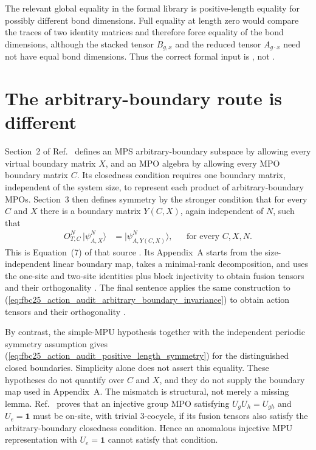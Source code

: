 \documentclass{article}
\begin{document}
The relevant global equality in the formal library is positive-length equality
for possibly different bond dimensions.  Full equality at length zero would
compare the traces of two identity matrices and therefore force equality of
the bond dimensions, although the stacked tensor $B_{g,x}$ and the reduced
tensor $A_{g\mathbin{\cdot}x}$ need not have equal bond dimensions.  Thus the
correct formal input is
, not
.

\section{The arbitrary-boundary route is different}

Section~2 of Ref.~\cite[source lines~302--331]{GarreRubio2023MPOSym} defines
an MPS arbitrary-boundary subspace by allowing every virtual boundary matrix
$X$, and an MPO algebra by allowing every MPO boundary matrix $C$.  Its
closedness condition requires one boundary matrix, independent of the system
size, to represent each product of arbitrary-boundary MPOs.  Section~3 then
defines symmetry by the stronger condition that for every $C$ and $X$ there
is a boundary matrix $Y(C,X)$, again independent of $N$, such that
\begin{align}
    O^N_{T,C}\,\lvert\psi^N_{A,X}\rangle
        &=\lvert\psi^N_{A,Y(C,X)}\rangle,
        &&\text{for every }C,X,N.
    \label{eq:fbc25_action_audit_arbitrary_boundary_invariance}
\end{align}
This is Equation~(7) of that source
\cite[source lines~429--460]{GarreRubio2023MPOSym}.  Its Appendix~A starts
from the size-independent linear boundary map, takes a minimal-rank
decomposition, and uses the one-site and two-site identities plus block
injectivity to obtain fusion tensors and their orthogonality
\cite[source lines~2305--2454]{GarreRubio2023MPOSym}.  The final sentence
applies the same construction to
(\ref{eq:fbc25_action_audit_arbitrary_boundary_invariance}) to obtain action
tensors and their orthogonality
\cite[source line~2455]{GarreRubio2023MPOSym}.

By contrast, the simple-MPU hypothesis together with the independent periodic
symmetry assumption gives
(\ref{eq:fbc25_action_audit_positive_length_symmetry}) for the distinguished
closed boundaries.  Simplicity alone does not assert this equality.  These
hypotheses do not quantify over $C$ and $X$, and they do not supply the
boundary map used in Appendix~A.  The mismatch is structural, not merely a
missing lemma.  Ref.~\cite[source lines~1211--1216]{GarreRubio2023MPOSym}
proves that an injective group MPO satisfying $U_gU_h=U_{gh}$ and
$U_e=\mathbf 1$ must be on-site, with trivial $3$-cocycle, if its fusion
tensors also satisfy the arbitrary-boundary closedness condition.  Hence an
anomalous injective MPU representation with $U_e=\mathbf 1$ cannot satisfy
that condition.
\end{document}
